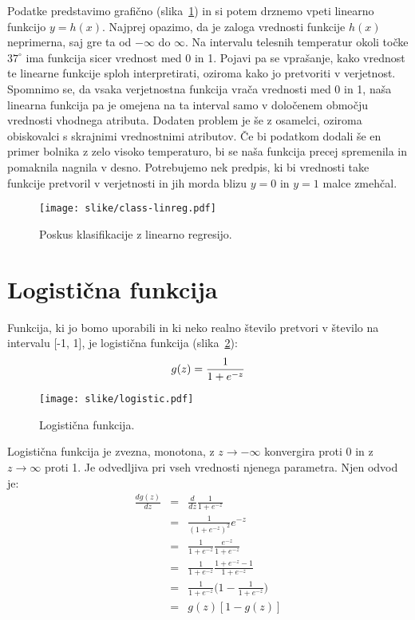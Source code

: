Podatke predstavimo grafično (slika~\ref{f:class-linreg}) in si potem drznemo vpeti linearno funkcijo $y=h(x)$. Najprej opazimo, da je zaloga vrednosti funkcije $h(x)$ neprimerna, saj gre ta od $-\infty$ do $\infty$. Na intervalu telesnih temperatur okoli točke $37^{\circ}$ ima funkcija sicer vrednost med 0 in 1. Pojavi pa se vprašanje, kako vrednost te linearne funkcije sploh interpretirati, oziroma kako jo pretvoriti v verjetnost. Spomnimo se, da vsaka verjetnostna funkcija vrača vrednosti med 0 in 1, naša linearna funkcija pa je omejena na ta interval samo v določenem območju vrednosti vhodnega atributa. Dodaten problem je še z osamelci, oziroma obiskovalci s skrajnimi vrednostnimi atributov. Če bi podatkom dodali še en primer bolnika z zelo visoko temperaturo, bi se naša funkcija precej spremenila in pomaknila nagnila v desno. Potrebujemo nek predpis, ki bi vrednosti take funkcije pretvoril v verjetnosti in jih morda blizu $y=0$ in $y=1$ malce zmehčal.

\begin{figure}[htbp]
\begin{center}
\texttt{[image: slike/class-linreg.pdf]}
\caption{Poskus klasifikacije z linearno regresijo.}
\label{f:class-linreg}
\end{center}
\end{figure}

\section{Logistična funkcija}

Funkcija, ki jo bomo uporabili in ki neko realno število pretvori v število na intervalu [-1, 1], je logistična funkcija (slika~\ref{f:logistic-function}):
\begin{equation}
  g(z) = {1\over 1+e^{-z}}
\end{equation}

\begin{figure}[htbp]
\begin{center}
\texttt{[image: slike/logistic.pdf]}
\caption{Logistična funkcija.}
\label{f:logistic-function}
\end{center}
\end{figure}

Logistična funkcija je zvezna, monotona, z $z\to -\infty$ konvergira proti 0 in z $z\to\infty$ proti 1. Je odvedljiva pri vseh vrednosti njenega parametra. Njen odvod je:
\begin{eqnarray}
  \frac{dg(z)}{dz} & = & \frac{d}{dz} \frac{1}{1+e^{-z}} \nonumber \\
  & = & \frac{1}{(1+e^{-z})^2} e^{-z} \nonumber \\
  & = & \frac{1}{1+e^{-z}}\frac{e^{-z}}{1+e^{-z}} \nonumber \\
  & = & \frac{1}{1+e^{-z}}\frac{1+e^{-z}-1}{1+e^{-z}} \nonumber \\
  & = & \frac{1}{1+e^{-z}}\big(1-\frac{1}{1+e^{-z}}\big) \nonumber \\
  & = & g(z)[1-g(z)]
\end{eqnarray}

